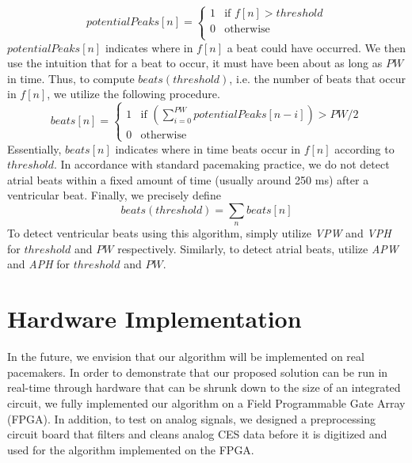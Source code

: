 \documentclass[conference]{IEEEtran}
\newcommand{\APW}{\textit{APW}}
\newcommand{\VPW}{\textit{VPW}}
\newcommand{\APH}{\textit{APH}}
\newcommand{\VPH}{\textit{VPH}}
\begin{document}
\begin{equation*}
	potentialPeaks[n]=\left\{ 
		\begin{array}{lr}
			1 & \text{if } f[n] > threshold \\
			0 & \text{otherwise}\\
		\end{array}
		\right.
\end{equation*}
$potentialPeaks[n]$ indicates where in $f[n]$ a beat could
have occurred. We then use the intuition that for a beat
to occur, it must have been about as long as $PW$ in time.
Thus, to compute $beats(threshold)$, i.e. the number of
beats that occur in $f[n]$, we utilize the following
procedure.
\begin{equation*}
	beats[n]=\left\{ 
		\begin{array}{lc}
			1 & \text{if } \left(\sum_{i=0}^{PW} potentialPeaks[n-i] \right) > PW/2 \\
			0 & \text{otherwise}
		\end{array}
		\right.
\end{equation*}
Essentially, $beats[n]$ indicates where in time beats
occur in $f[n]$ according to $threshold$. In accordance
with standard pacemaking practice, we do not detect atrial beats within a fixed amount of time (usually around 250 ms) after
a ventricular beat. Finally, we
precisely define \begin{equation*}
	beats(threshold) = \sum_n beats[n]
\end{equation*}
To detect ventricular beats using this algorithm,
simply utilize \VPW{} and \VPH{} for $threshold$ and $PW$
respectively. Similarly, to detect atrial beats, utilize
\APW{} and \APH{} for $threshold$ and $PW$.

\section{Hardware Implementation}
In the future, we envision that our algorithm will be
implemented on real pacemakers. In order to
demonstrate that our proposed solution can be run in
real-time through hardware that can be shrunk down to
the size of an integrated circuit, we fully implemented
our algorithm on a Field Programmable Gate Array
(FPGA). In addition, to test on analog signals, we
designed a preprocessing circuit board that filters and
cleans analog CES data before it is digitized and used
for the algorithm implemented on the FPGA.
\end{document}
